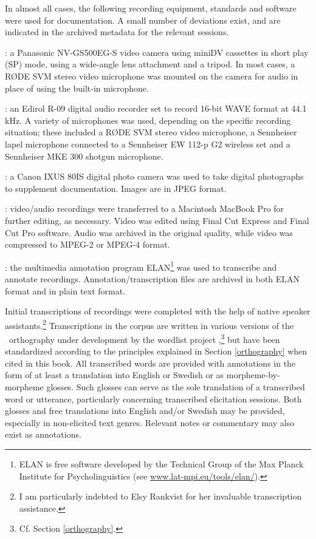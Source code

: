 In almost all cases, the following recording equipment, standards and software were used for documentation. A small number of deviations exist, and are indicated in the archived metadata for the relevant sessions. 
 
: a Panasonic NV-GS500EG-S video camera using miniDV cassettes in short play (SP) mode, using a wide-angle lens attachment and a tripod. In most cases, a RØDE SVM stereo video microphone was mounted on the camera for audio in place of using the built-in microphone.

: an Edirol R-09 digital audio recorder set to record 16-bit WAVE format at 44.1 kHz. A variety of microphones was used, depending on the specific recording situation; these included a RØDE SVM stereo video microphone, a Sennheiser lapel microphone connected to a Sennheiser EW 112-p G2 wireless set and a Sennheiser MKE 300 shotgun microphone. %

: a Canon IXUS 80IS digital photo camera was used to take digital photographs to supplement documentation. Images are in JPEG format.

: video/audio recordings were transferred to a Macintosh MacBook Pro for further editing, as necessary. Video was edited using Final Cut Express and Final Cut Pro software. Audio was archived in the original quality, while video was compressed to MPEG-2 or MPEG-4 format.

: the multimedia annotation program ELAN\footnote{ELAN is free software developed by the Technical Group of the Max Planck Institute for Psycholinguistics (see \href{http://www.lat-mpi.eu/tools/elan/}{www.lat-mpi.eu/tools/elan/}).} 
was used to transcribe and annotate recordings. Annotation/transcription files are archived in both ELAN format and in plain text format.


Initial transcriptions of recordings were completed with the help of native speaker assistants.\footnote{I am particularly indebted to Elsy Rankvist for her invaluable transcription assistance.} 
Transcriptions in the corpus are written in various versions of the \PS\ orthography under development by the wordlist project ,\footnote{Cf. Section \ref{orthography}.}  %
but have been standardized according to the principles explained in Section \ref{orthography} when cited in this book. 
All transcribed words are provided with annotations in the form of at least a translation into English or Swedish or as morpheme-by-morpheme glosses. Such glosses can serve as the sole translation of a transcribed word or utterance, particularly concerning transcribed elicitation sessions. Both glosses and free translations into English and/or Swedish may be provided, especially in non-elicited text genres. Relevant notes or commentary may also exist as annotations. 

